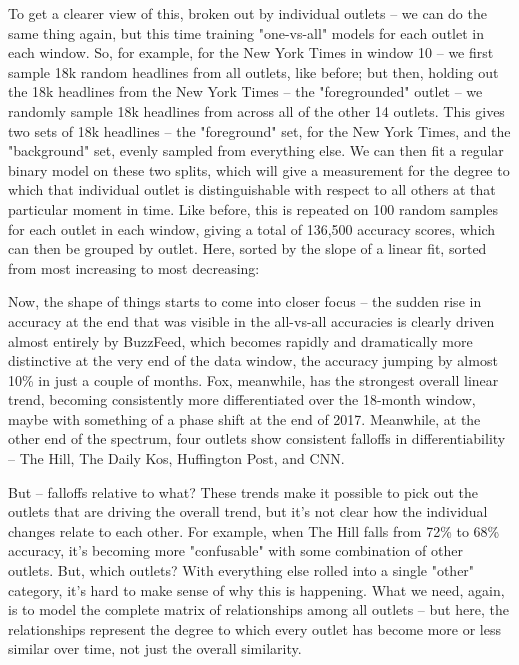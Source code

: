 \documentclass{scrartcl}
\begin{document}
To get a clearer view of this, broken out by individual outlets -- we can do the same thing again, but this time training "one-vs-all" models for each outlet in each window. So, for example, for the New York Times in window 10 -- we first sample 18k random headlines from all outlets, like before; but then, holding out the 18k headlines from the New York Times -- the "foregrounded" outlet -- we randomly sample 18k headlines from across all of the other 14 outlets. This gives two sets of 18k headlines -- the "foreground" set, for the New York Times, and the "background" set, evenly sampled from everything else. We can then fit a regular binary model on these two splits, which will give a measurement for the degree to which that individual outlet is distinguishable with respect to all others at that particular moment in time. Like before, this is repeated on 100 random samples for each outlet in each window, giving a total of 136,500 accuracy scores, which can then be grouped by outlet. Here, sorted by the slope of a linear fit, sorted from most increasing to most decreasing:


Now, the shape of things starts to come into closer focus -- the sudden rise in accuracy at the end that was visible in the all-vs-all accuracies is clearly driven almost entirely by BuzzFeed, which becomes rapidly and dramatically more distinctive at the very end of the data window, the accuracy jumping by almost 10\% in just a couple of months. Fox, meanwhile, has the strongest overall linear trend, becoming consistently more differentiated over the 18-month window, maybe with something of a phase shift at the end of 2017. Meanwhile, at the other end of the spectrum, four outlets show consistent falloffs in differentiability -- The Hill, The Daily Kos, Huffington Post, and CNN.

But -- falloffs relative to what? These trends make it possible to pick out the outlets that are driving the overall trend, but it's not clear how the individual changes relate to each other. For example, when The Hill falls from 72\% to 68\% accuracy, it's becoming more "confusable" with some combination of other outlets. But, which outlets? With everything else rolled into a single "other" category, it's hard to make sense of why this is happening. What we need, again, is to model the complete matrix of relationships among all outlets -- but here, the relationships represent the degree to which every outlet has become more or less similar over time, not just the overall similarity.
\end{document}
